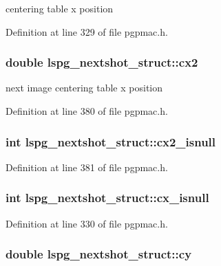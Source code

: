centering table x position 



Definition at line 329 of file pgpmac.\-h.

\hypertarget{structlspg__nextshot__struct_a10d45763100bc59f9a5f68f1b48db6d3}{
\subsubsection[{cx2}]{\setlength{\rightskip}{0pt plus 5cm}double lspg\-\_\-nextshot\-\_\-struct\-::cx2}}\label{structlspg__nextshot__struct_a10d45763100bc59f9a5f68f1b48db6d3}


next image centering table x position 



Definition at line 380 of file pgpmac.\-h.

\hypertarget{structlspg__nextshot__struct_a3ad947f4efe2cb5c338244b019334749}{
\subsubsection[{cx2\-\_\-isnull}]{\setlength{\rightskip}{0pt plus 5cm}int lspg\-\_\-nextshot\-\_\-struct\-::cx2\-\_\-isnull}}\label{structlspg__nextshot__struct_a3ad947f4efe2cb5c338244b019334749}


Definition at line 381 of file pgpmac.\-h.

\hypertarget{structlspg__nextshot__struct_a779b99533f0ed4e659177afb0b791ad2}{
\subsubsection[{cx\-\_\-isnull}]{\setlength{\rightskip}{0pt plus 5cm}int lspg\-\_\-nextshot\-\_\-struct\-::cx\-\_\-isnull}}\label{structlspg__nextshot__struct_a779b99533f0ed4e659177afb0b791ad2}


Definition at line 330 of file pgpmac.\-h.

\hypertarget{structlspg__nextshot__struct_ab7a7b37a17f06c4e9ebdcdf056946098}{
\subsubsection[{cy}]{\setlength{\rightskip}{0pt plus 5cm}double lspg\-\_\-nextshot\-\_\-struct\-::cy}}\label{structlspg__nextshot__struct_ab7a7b37a17f06c4e9ebdcdf056946098}


